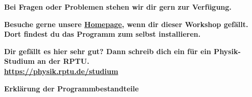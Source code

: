 \documentclass{scrartcl}
\begin{document}
        \vspace{1cm}
        \begin{center}
        {\large\textbf{\sffamily Bei Fragen oder Problemen stehen wir dir gern zur Verfügung.}}\\[2cm]
        \end{center}
        \vfill
        
        \begin{minipage}{0.45\textwidth}
            \centering
            \noindent\textbf{Besuche gerne unsere \href{https://physik.rptu.de/ags/rethfeld/lehre-1/physik-im-weltall}{Homepage}, wenn dir dieser Workshop gefällt. Dort findest du das Programm zum selbst installieren.\hphantom{p}\\[.5cm]}
        \end{minipage}
        \hfil
        \begin{minipage}{0.45\textwidth}
            \centering
            \noindent\textbf{Dir gefällt es hier sehr gut? Dann schreib dich ein für ein Physik-Studium an der RPTU.\\
            \url{https://physik.rptu.de/studium}\\[.5cm]}
        \end{minipage}
        


        \newpage

        \begin{center}
        {\Large\textbf{\sffamily Erklärung der Programmbestandteile}}\\[.5cm]
        \end{center}
        \lstset{basicstyle=\texttt, tabsize=2, morekeywords=Programmname, keywordstyle=\textsc}%
\end{document}
